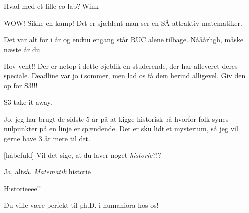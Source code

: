 \documentclass[a4paper,11pt]{article}
\begin{document}
\begin{sketch}


 Hvad med et lille co-lab? Wink



 WOW! Sikke en kamp! Det er sjældent man ser en SÅ attraktiv matematiker. 

 Det var alt for i år og endnu engang står RUC alene tilbage.  Nååårhgh, måske næste år du


 Hov vent!! Der er netop i dette øjeblik en studerende, der har afleveret deres speciale. Deadline var jo i sommer, men lad os få dem herind alligevel. Giv den op for S3!!!


 S3 take it away.

 Jo, jeg har brugt de sidste 5 år på at kigge historisk på hvorfor folk synes nulpunkter på en linje er spændende. Det er sku lidt et mysterium, så jeg vil gerne have 3 år mere til det.

[håbefuld] Vil det sige, at du laver noget \textit{historie}?!? 

 Ja, altså. \textit{Matematik} historie

 Historieeee!! 


 Du ville være perfekt til ph.D. i humaniora hos os!


\end{sketch}
\end{document}
